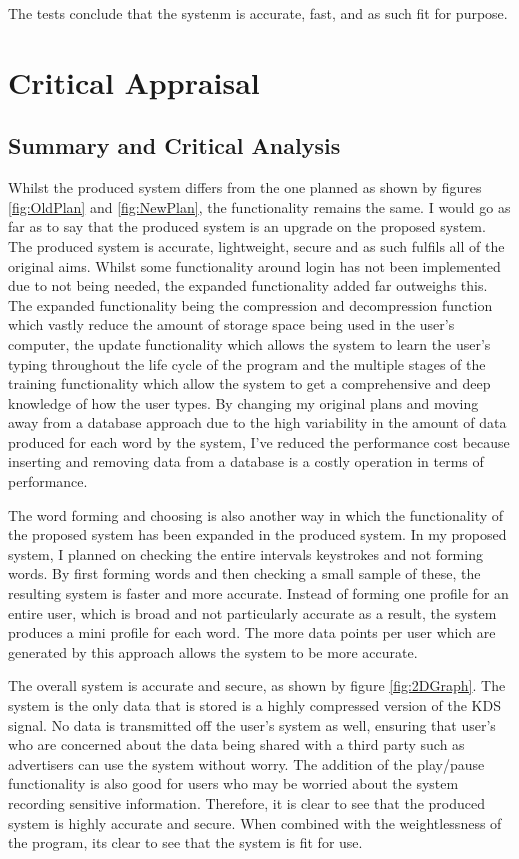 \documentclass[10pt,a4paper]{report}
\begin{document}
The tests conclude that the systenm is accurate, fast, and as such fit for purpose.



\chapter{Critical Appraisal}




\section{Summary and Critical Analysis}

 Whilst the produced system differs from the one planned as shown by figures \ref{fig:OldPlan} and \ref{fig:NewPlan}, the functionality remains the same. I would go as far as to say that the produced system is an upgrade on the proposed system. The produced system is accurate, lightweight, secure and as such fulfils all of the original aims. Whilst some functionality around login has not been implemented due to not being needed, the expanded functionality added far outweighs this. The expanded functionality being the compression and decompression function which vastly reduce the amount of storage space being used in the user's computer, the update functionality which allows the system to learn the user's typing throughout the life cycle of the program and the multiple stages of the training functionality which allow the system to get a comprehensive and deep knowledge of how the user types. By changing my original plans and moving away from a database approach due to the high variability in the amount of data produced for each word by the system, I've reduced the performance cost because inserting and removing data from a database is a costly operation in terms of performance.

The word forming and choosing is also another way in which the functionality of the proposed system has been expanded in the produced system. In my proposed system, I planned on checking the entire intervals keystrokes and not forming words. By first forming words and then checking a small sample of these, the resulting system is faster and more accurate. Instead of forming one profile for an entire user, which is broad and not particularly accurate as a result, the system produces a mini profile for each word. The more data points per user which are generated by this approach allows the system to be more accurate.

The overall system is accurate and secure, as shown by figure \ref{fig:2DGraph}. The system is the only data that is stored is a highly compressed version of the KDS signal. No data is transmitted off the user's system as well, ensuring that user's who are concerned about the data being shared with a third party such as advertisers can use the system without worry. The addition of the play/pause functionality is also good for users who may be worried about the system recording sensitive information. Therefore, it is clear to see that the produced system is highly accurate and secure. When combined with the weightlessness of the program, its clear to see that the system is fit for use.
\end{document}
